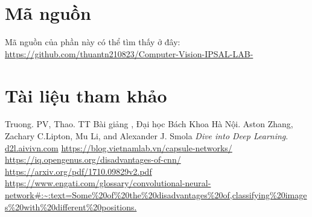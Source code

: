 \documentclass{article}
\begin{document}
\section{Mã nguồn}
Mã nguồn của phần này có thể tìm thấy ở đây: \\\url{https://github.com/thuantn210823/Computer-Vision-IPSAL-LAB-}

\section{Tài liệu tham khảo}
    \begin{thebibliography}{9}
        Truong. PV, Thao. TT Bài giảng , Đại học Bách Khoa Hà Nội.
        Aston Zhang, Zachary C.Lipton, Mu Li, and Alexander J. Smola \emph{Dive into Deep Learning}.
        \url{d2l.aivivn.com}
        \url{https://blog.vietnamlab.vn/capsule-networks/}
        \url{https://iq.opengenus.org/disadvantages-of-cnn/}
        \url{https://arxiv.org/pdf/1710.09829v2.pdf}
        \url{https://www.engati.com/glossary/convolutional-neural-network#:~:text=Some%20of%20the%20disadvantages%20of,classifying%20images%20with%20different%20positions.}

    \end{thebibliography}
\end{document}
